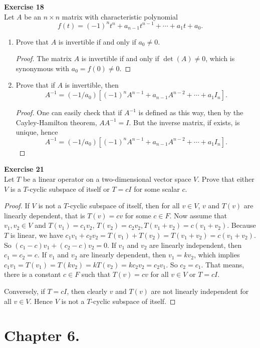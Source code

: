\documentclass[12pt, a4paper]{article}
\theoremstyle{plain}
\newenvironment{exercise}[2][Exercise]
    { \begin{mdframed}[backgroundcolor=gray!20] \textbf{#1 #2} \\}
    {  \end{mdframed}}
\begin{document}
\begin{exercise}{18}
Let $A$ be an $n\times n$ matrix with characteristic polynomial 
\[
f(t)=(-1)^nt^n+a_{n-1}t^{n-1}+\cdots+a_1t+a_0.
\]
\begin{enumerate}[label=(\alph*)]
\item Prove that $A$ is invertible if and only if $a_0\neq 0$.
	\begin{proof}
	The matrix $A$ is invertible if and only if $\det(A)\neq 0$, which is synonymous with $a_0=f(0)\neq 0$.
	\end{proof}
\item Prove that if $A$ is invertible, then 
\[
A^{-1}=(-1/a_0)[(-1)^nA^{n-1}+a_{n-1}A^{n-2}+\cdots+a_1I_n].
\]
	\begin{proof}
	One can easily check that if $A^{-1}$ is defined as this way, then by the Cayley-Hamilton theorem, $AA^{-1}=I$. But the inverse matrix, if exists, is unique, hence 
	\[
A^{-1}=(-1/a_0)[(-1)^nA^{n-1}+a_{n-1}A^{n-2}+\cdots+a_1I_n].
	\]
	\end{proof}
\end{enumerate}
\end{exercise}

\begin{exercise}{21}
Let $T$ be a linear operator on a two-dimensional vector space $V$. Prove that either $V$ is a $T$-cyclic subspace of itself or $T=cI$ for some scalar $c$.
\end{exercise}
	\begin{proof}
	If $V$ is not a $T$-cyclic subspace of itself, then for all $v\in V$, $v$ and $T(v)$ are linearly dependent, that is $T(v)=cv$ for some $c\in F$. Now assume that $v_1,v_2\in V$ and $T(v_1)=c_1v_2$, $T(v_2)=c_2v_2, T(v_1+v_2)=c(v_1+v_2)$. Because $T$ is linear, we have $c_1v_1+c_2v_2=T(v_1)+T(v_2)=T(v_1+v_2)=c(v_1+v_2)$. So $(c_1-c)v_1+(c_2-c)v_2=0$. If $v_1$ and $v_2$ are linearly independent, then $c_1=c_2=c$. If $v_1$ and $v_2$ are linearly dependent, then $v_1=kv_2$, which implies $c_1v_1=T(v_1)=T(kv_2)=kT(v_2)=kc_2v_2=c_2v_1$. So $c_2=c_1$. That means, there is a constant $c\in F$ such that $T(v)=cv$ for all $v\in V$ or $T=cI$. 
	
	Conversely, if $T=cI$, then clearly $v$ and $T(v)$ are not linearly independent for all $v\in V$. Hence $V$ is not a $T$-cyclic subspace of itself.
	\end{proof}
	
\section*{Chapter 6.}
\end{document}
